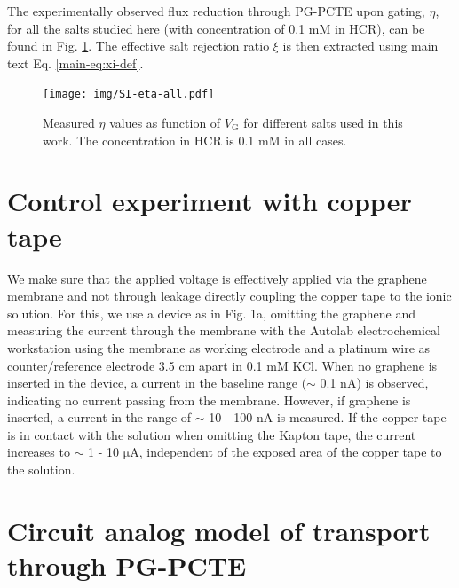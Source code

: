 \documentclass[manuscript=suppinfo,email=true, hyperref=true, keywords=false]{achemso}
\newcommand{\Fig}{Fig.}
\begin{document}
The experimentally observed flux reduction through PG-PCTE upon
gating, $\eta$, for all the salts studied here (with concentration of
0.1 mM in HCR), can be found in \Fig{} \ref{fig:eta-all}. The effective salt
rejection ratio $\xi$ is then extracted using main text
Eq. \ref{main-eq:xi-def}.

\begin{figure}[htbp]
  \centering
  \texttt{[image: img/SI-eta-all.pdf]}
  \caption{Measured $\eta$ values as function of $V_{\mathrm{G}}$ for
    different salts used in this work. The concentration in HCR is 0.1
    mM in all cases.}
  \label{fig:eta-all}
\end{figure}


\section{Control experiment with copper tape}
\label{sec:copper}
We make sure that the applied voltage is effectively applied via the
graphene membrane and not through leakage directly coupling the
copper tape to the ionic solution. For this, we use a device as in \Fig
1a, omitting the graphene and measuring the current through the
membrane with the Autolab electrochemical workstation using the
membrane as working electrode and a platinum wire as counter/reference
electrode 3.5 cm apart in 0.1 mM KCl. When no graphene is inserted in
the device, a current in the baseline range ($\sim$ 0.1 nA) is
observed, indicating no current passing from the membrane. However, if
graphene is inserted, a current in the range of $\sim$ 10 - 100 nA is
measured. If the copper tape is in contact with the solution when
omitting the Kapton tape, the current increases to $\sim$ 1 - 10
$\mathrm{\mu}$A, independent of the exposed area of the copper tape to
the solution.


\section{Circuit analog model of transport through PG-PCTE}
\label{sec:R-model}
\end{document}
